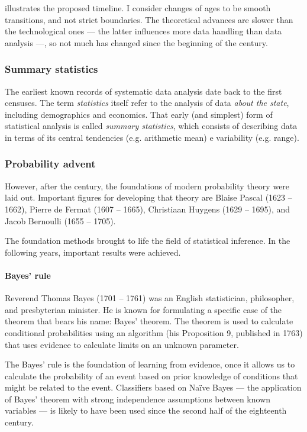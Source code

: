  illustrates the proposed timeline.  I consider changes of
ages to be smooth transitions, and not strict boundaries.  The theoretical advances are
slower than the technological ones --- the latter influences more data handling than data
analysis ---, so not much has changed since the beginning of the  century.

\subsubsection{Summary statistics}

The earliest known records of systematic data analysis date back to the first censuses.
The term \emph{statistics} itself refer to the analysis of data \emph{about the state},
including demographics and economics.  That early (and simplest) form of statistical
analysis is called \emph{summary statistics}, which consists of describing data in terms
of its central tendencies (e.g. arithmetic mean) e variability (e.g. range).

\subsubsection{Probability advent}

However, after the  century, the foundations of modern probability theory were
laid out.  Important figures for developing that theory are Blaise Pascal (1623
-- 1662), Pierre de Fermat (1607 -- 1665), Christiaan Huygens (1629 -- 1695), and Jacob
Bernoulli (1655 -- 1705).

The foundation methods brought to life the field of statistical inference. In the
following years, important results were achieved.

\paragraph{Bayes' rule}

Reverend Thomas Bayes (1701 -- 1761) was an English statistician, philosopher, and
presbyterian minister.  He is known for formulating a specific case of the theorem that
bears his name: Bayes' theorem.  The theorem is used to calculate conditional
probabilities using an algorithm (his Proposition 9, published in 1763) that uses evidence to calculate
limits on an unknown parameter.

The Bayes' rule is the foundation of learning from evidence, once it allows us to
calculate the probability of an event based on prior knowledge of conditions that might be
related to the event.  Classifiers based on Naïve Bayes --- the application of Bayes'
theorem with strong independence assumptions between known variables --- is likely to have
been used since the second half of the eighteenth century.

